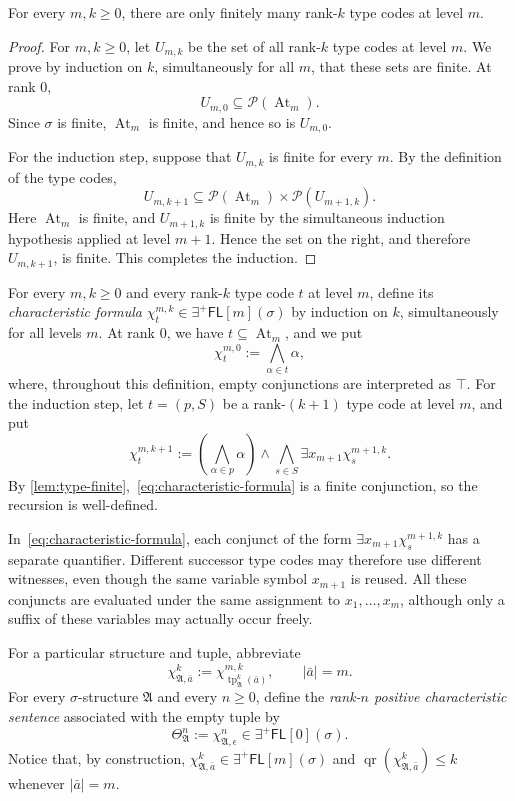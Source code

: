\documentclass{lmcs}
\newcommand{\EPFL}{\exists^{+}\!\mathsf{FL}}
\newcommand{\qr}{\operatorname{qr}}
\newcommand{\At}{\operatorname{At}}
\newcommand{\tp}{\operatorname{tp}}
\newcommand{\true}{\top}
\newcommand{\A}{\mathfrak{A}}
\begin{document}
\begin{lem}\label{lem:type-finite}
For every $m,k\geq0$, there are only finitely many rank-$k$ type codes at
level $m$.
\end{lem}

\begin{proof}
For $m,k\geq0$, let $U_{m,k}$ be the set of all rank-$k$ type codes at level
$m$.  We prove by induction on $k$, simultaneously for all $m$, that these
sets are finite.  At rank $0$,
\[
   U_{m,0}\subseteq\mathcal P(\At_m).
\]
Since $\sigma$ is finite, $\At_m$ is finite, and hence so is $U_{m,0}$.

For the induction step, suppose that $U_{m,k}$ is finite for every $m$.  By
the definition of the type codes,
\[
   U_{m,k+1}
   \subseteq
   \mathcal P(\At_m)
   \times
   \mathcal P(U_{m+1,k}).
\]
Here $\At_m$ is finite, and $U_{m+1,k}$ is finite by the simultaneous
induction hypothesis applied at level $m+1$.  Hence the set on the right, and
therefore $U_{m,k+1}$, is finite.  This completes the induction.
\end{proof}

\begin{defi}\label{def:characteristic-formula}
For every $m,k\geq0$ and every rank-$k$ type code $t$ at level $m$, define
its \emph{characteristic formula}
$\chi_t^{m,k}\in\EPFL[m](\sigma)$ by induction on $k$, simultaneously for all
levels $m$.  At rank $0$, we have $t\subseteq\At_m$, and we put
\[
  \chi_t^{m,0}:=\bigwedge_{\alpha\in t}\alpha,
\]
where, throughout this definition, empty conjunctions are interpreted as
$\true$.  For the induction step, let $t=(p,S)$ be a rank-$(k+1)$ type code
at level $m$, and put
\begin{equation}
  \chi_t^{m,k+1}
  :=
  \left(\bigwedge_{\alpha\in p}\alpha\right)
  \wedge
  \bigwedge_{s\in S}
     \exists x_{m+1}\chi_s^{m+1,k}.
  \label{eq:characteristic-formula}
\end{equation}
By \cref{lem:type-finite},~\eqref{eq:characteristic-formula} is a finite
conjunction, so the
recursion is well-defined.

In~\eqref{eq:characteristic-formula}, each conjunct of the form
$\exists x_{m+1}\chi_s^{m+1,k}$ has a separate quantifier.  Different
successor type codes may therefore use different witnesses, even though the
same variable symbol $x_{m+1}$ is reused.  All these conjuncts are evaluated
under the same assignment to $x_1,\ldots,x_m$, although only a suffix of these
variables may actually occur freely.

For a particular structure and tuple, abbreviate
\[
  \chi_{\A,\bar a}^{k}
  :=
  \chi_{\tp_{\A}^{k}(\bar a)}^{m,k},
  \qquad |\bar a|=m.
\]
For every $\sigma$-structure $\A$ and every $n\geq0$, define the
\emph{rank-$n$ positive characteristic sentence} associated with the empty
tuple by
\[
   \Theta_{\A}^{n}
   :=
   \chi_{\A,\epsilon}^{n}
   \in\EPFL[0](\sigma).
\]
Notice that, by construction,
$\chi_{\A,\bar a}^{k}\in\EPFL[m](\sigma)$ and
$\qr(\chi_{\A,\bar a}^{k})\leq k$ whenever $|\bar a|=m$.
\end{defi}
\end{document}
